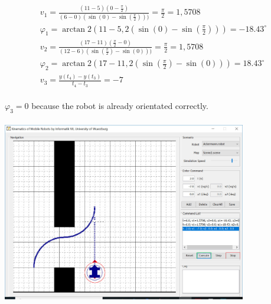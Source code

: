 \documentclass{article}
\begin{document}
	\begin{gather}
	v_1 = \frac{(11-5)(0-\frac{\pi}{2})}{(6-0)(\sin(0) - \sin(\frac{\pi}{2})))} = \frac{\pi}{2} = 1,5708\\
	\varphi_1 = \arctan2(11 - 5, 2 (\sin(0) - \sin(\frac{\pi}{2}))) = -18.43^\circ\\
	v_2 = \frac{(17-11)(\frac{\pi}{2} - 0)}{(12-6)(\sin(\frac{\pi}{2}) - \sin(0)))} = \frac{\pi}{2} = 1,5708\\
	\varphi_2 = \arctan2(17 - 11, 2 (\sin(\frac{\pi}{2}) - \sin(0))) = 18.43^\circ\\
	v_3 = \frac{y(t_4) - y(t_3)}{t_4 - t_3} = -7
	\end{gather}\\
	$\varphi_3 = 0$ because the robot is already orientated correctly.\\
	\\
	\includegraphics[width=0.8\textwidth]{figures/ackermann-scene-2.JPG}
\end{document}
